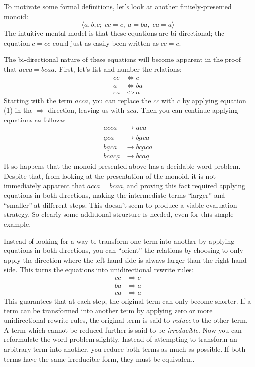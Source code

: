 \documentclass[a4paper,headsepline,bibliography=totoc,toc=flat,fleqn,twoside=semi]{scrbook}
\theoremstyle{definition}
\theoremstyle{definition}
\theoremstyle{definition}
\begin{document}
To motivate some formal definitions, let's look at another finitely-presented monoid:
\[\langle a,b,c;\; cc=c,\; a=ba,\; ca=a\rangle\]
The intuitive mental model is that these equations are bi-directional; the equation $c=cc$ could just as easily been written as $cc=c$.

The bi-directional nature of these equations will become apparent in the proof that $acca=bcaa$. First, let's list and number the relations:
\begin{align}
cc&\Longleftrightarrow c\tag{1}\\
a&\Longleftrightarrow ba\tag{2}\\
ca&\Longleftrightarrow a\tag{3}
\end{align}
Starting with the term $acca$, you can replace the $cc$ with $c$ by applying equation (1) in the $\Rightarrow$ direction, leaving us with $aca$. Then you can continue applying equations as follows:
\begin{align}
a\underline{cc}a&\rightarrow a\underline{c}a\tag{Eq 1, $\Rightarrow$}\\
\underline{a}ca&\rightarrow \underline{ba}ca\tag{Eq 2, $\Rightarrow$}\\
b\underline{a}ca&\rightarrow b\underline{ca}ca\tag{Eq 3, $\Leftarrow$}\\
bca\underline{ca}&\rightarrow bca\underline{a}\tag{Eq 3, $\Rightarrow$}
\end{align}
It so happens that the monoid presented above has a decidable word problem. Despite that, from looking at the presentation of the monoid, it is not immediately apparent that $acca=bcaa$, and proving this fact required applying equations in both directions, making the intermediate terms ``larger'' and ``smaller'' at different steps. This doesn't seem to produce a viable evaluation strategy. So clearly some additional structure is needed, even for this simple example.

Instead of looking for a way to transform one term into another by applying equations in both directions, you can ``orient'' the relations by choosing to only apply the direction where the left-hand side is always larger than the right-hand side. This turns the equations into unidirectional rewrite rules:
\begin{align}
cc&\Longrightarrow c\tag{1}\\
ba&\Longrightarrow a\tag{2}\\
ca&\Longrightarrow a\tag{3}
\end{align}
This guarantees that at each step, the original term can only become shorter. If a term can be transformed into another term by applying zero or more unidirectional rewrite rules, the original term is said to \emph{reduce} to the other term. A term which cannot be reduced further is said to be \emph{irreducible}. Now you can reformulate the word problem slightly. Instead of attempting to transform an arbitrary term into another, you reduce both terms as much as possible. If both terms have the same irreducible form, they must be equivalent.
\end{document}
